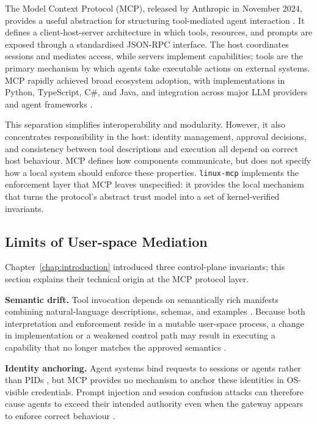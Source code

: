 The Model Context Protocol (MCP), released by Anthropic in November 2024, provides a useful abstraction for structuring tool-mediated agent interaction \cite{mcp2025}.
It defines a client-host-server architecture in which tools, resources, and prompts are exposed through a standardised JSON-RPC interface.
The host coordinates sessions and mediates access, while servers implement capabilities; tools are the primary mechanism by which agents take executable actions on external systems.
MCP rapidly achieved broad ecosystem adoption, with implementations in Python, TypeScript, C\#, and Java, and integration across major LLM providers and agent frameworks \cite{mcp2025}.

This separation simplifies interoperability and modularity.
However, it also concentrates responsibility in the host: identity management, approval decisions, and consistency between tool descriptions and execution all depend on correct host behaviour.
MCP defines how components communicate, but does not specify how a local system should enforce these properties.
\texttt{linux-mcp} implements the enforcement layer that MCP leaves unspecified: it provides the local mechanism that turns the protocol's abstract trust model into a set of kernel-verified invariants.

\subsection{Limits of User-space Mediation}
\label{sec:limits-user-space}

Chapter~\ref{chap:introduction} introduced three control-plane invariants; this section explains their technical origin at the MCP protocol layer.

\textbf{Semantic drift.}
Tool invocation depends on semantically rich manifests combining natural-language descriptions, schemas, and examples \cite{schick2023toolformer, patil2023gorilla, mcp2025}.
Because both interpretation and enforcement reside in a mutable user-space process, a change in implementation or a weakened control path may result in executing a capability that no longer matches the approved semantics \cite{liu2023prompt}.

\textbf{Identity anchoring.}
Agent systems bind requests to sessions or agents rather than PIDs \cite{yao2023react, autogpt2023, park2023generative}, but MCP provides no mechanism to anchor these identities in OS-visible credentials.
Prompt injection and session confusion attacks can therefore cause agents to exceed their intended authority even when the gateway appears to enforce correct behaviour \cite{greshake2023prompt, openclaw_security1, openclaw_security2}.

